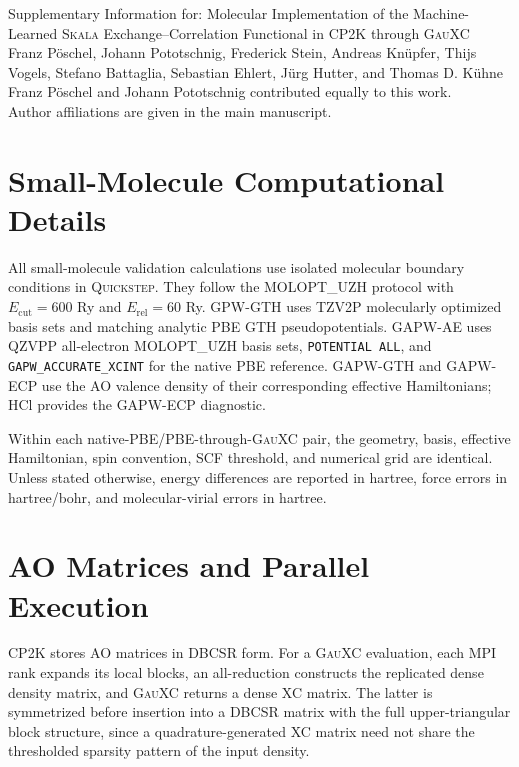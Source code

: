 \documentclass[10pt]{article}
\newcommand{\Skala}{\textsc{Skala}}
\newcommand{\GauXC}{\textsc{GauXC}}
\newcommand{\CPtwoK}{\textsc{CP2K}}
\newcommand{\GPW}{\textsc{GPW}}
\newcommand{\GAPW}{\textsc{GAPW}}
\newcommand{\GTH}{\textsc{GTH}}
\newcommand{\GPWGTH}{\GPW{}-\GTH{}}
\newcommand{\GAPWAE}{\GAPW{}-AE}
\newcommand{\GAPWGTH}{\GAPW{}-\GTH{}}
\newcommand{\GAPWECP}{\GAPW{}-ECP}
\begin{document}
\begin{center}
{\large Supplementary Information for: Molecular Implementation of the Machine-Learned \Skala{} Exchange--Correlation Functional in \CPtwoK{} through \GauXC{}}\\[1ex]
Franz P\"oschel, Johann Pototschnig, Frederick Stein, Andreas Kn\"upfer, Thijs Vogels, Stefano Battaglia, Sebastian Ehlert, J\"urg Hutter, and Thomas D. K\"uhne\\[0.5ex]
Franz P\"oschel and Johann Pototschnig contributed equally to this work.\\[0.5ex]
Author affiliations are given in the main manuscript.
\end{center}

\section{{Small-Molecule Computational Details}}

\begingroup

All small-molecule validation calculations use isolated molecular boundary conditions in \textsc{Quickstep}.  They follow the \textsc{MOLOPT\_UZH} protocol\cite{Mirhosseini2026UZH} with \(E_{\mathrm{cut}}=600\) Ry and \(E_{\mathrm{rel}}=60\) Ry.  \GPWGTH{} uses TZV2P molecularly optimized basis sets and matching analytic PBE \GTH{} pseudopotentials.  \GAPWAE{} uses QZVPP all-electron \textsc{MOLOPT\_UZH} basis sets, \texttt{POTENTIAL ALL}, and \texttt{GAPW\_ACCURATE\_XCINT} for the native PBE reference.  \GAPWGTH{} and \GAPWECP{} use the AO valence density of their corresponding effective Hamiltonians; HCl provides the \GAPWECP{} diagnostic.

Within each native-PBE/PBE-through-\GauXC{} pair, the geometry, basis, effective Hamiltonian, spin convention, SCF threshold, and numerical grid are identical.  Unless stated otherwise, energy differences are reported in hartree, force errors in hartree/bohr, and molecular-virial errors in hartree.
\endgroup

\section{{AO Matrices and Parallel Execution}}

\begingroup

\CPtwoK{} stores AO matrices in DBCSR form.\cite{Schuett2016DBCSR}  For a \GauXC{} evaluation, each MPI rank expands its local blocks, an all-reduction constructs the replicated dense density matrix, and \GauXC{} returns a dense XC matrix.  The latter is symmetrized before insertion into a DBCSR matrix with the full upper-triangular block structure, since a quadrature-generated XC matrix need not share the thresholded sparsity pattern of the input density.
\end{document}
